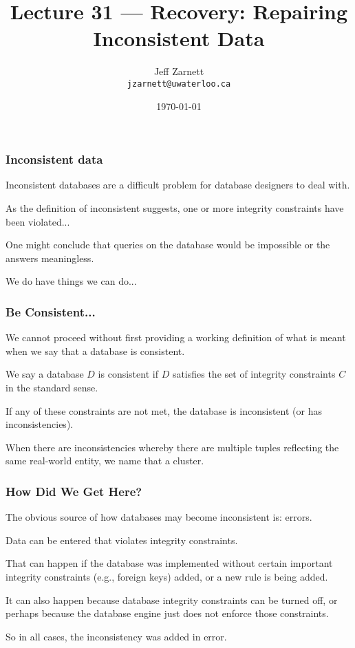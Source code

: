 

\title{Lecture 31 --- Recovery: Repairing Inconsistent Data}

\author{Jeff Zarnett \\ \small \texttt{jzarnett@uwaterloo.ca}}
\date{\today}




\begin{frame}
  \titlepage

 \end{frame}


\begin{frame}
\frametitle{Inconsistent data}

Inconsistent databases are a difficult problem for database designers to deal with. 

As the definition of inconsistent suggests, one or more integrity constraints have been violated... 

One might conclude that queries on the database would be impossible or the answers meaningless.

We do have things we can do...

\end{frame}


\begin{frame}
\frametitle{Be Consistent...}

We cannot proceed without first providing a working definition of what is meant when we say that a database is consistent. 

We say a database $D$ is \alert{consistent} if $D$ satisfies the set of integrity constraints $C$ in the standard sense. 

If any of these constraints are not met, the database is \alert{inconsistent} (or has inconsistencies). 

When there are inconsistencies whereby there are multiple tuples reflecting the same real-world entity, we name that a \alert{cluster}.


\end{frame}

\begin{frame}
\frametitle{How Did We Get Here?}

The obvious source of how databases may become inconsistent is: errors. 

Data can be entered that violates integrity constraints. 

That can happen if the database was implemented without certain important integrity constraints (e.g., foreign keys) added, or a new rule is being added. 

It can also happen because database integrity constraints can be turned off, or perhaps because the database engine just does not enforce those constraints. 

So in all cases, the inconsistency was added in error. 

\end{frame}


